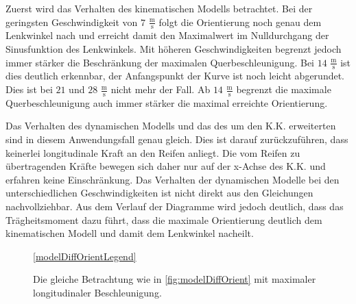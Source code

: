 \documentclass{like}
\begin{document}
Zuerst wird das Verhalten des kinematischen Modells betrachtet. Bei der geringsten Geschwindigkeit von $7$ $\frac{\text{m}}{\text{s}}$ folgt die Orientierung noch genau dem Lenkwinkel nach und erreicht damit den Maximalwert im Nulldurchgang der Sinusfunktion des Lenkwinkels. Mit höheren Geschwindigkeiten begrenzt jedoch immer stärker die Beschränkung der maximalen Querbeschleunigung. Bei $14$ $\frac{\text{m}}{\text{s}}$ ist dies deutlich erkennbar, der Anfangspunkt der Kurve ist noch leicht abgerundet. Dies ist bei $21$ und $28$ $\frac{\text{m}}{\text{s}}$ nicht mehr der Fall. Ab  $14$ $\frac{\text{m}}{\text{s}}$ begrenzt die maximale Querbeschleunigung auch immer stärker die maximal erreichte Orientierung. 

Das Verhalten des dynamischen Modells und das des um den \ac{K.K.} erweiterten sind in diesem Anwendungsfall genau gleich. Dies ist darauf zurückzuführen, dass keinerlei longitudinale Kraft an den Reifen anliegt. Die vom Reifen zu übertragenden Kräfte bewegen sich daher nur auf der x-Achse des \ac{K.K.} und erfahren keine Einschränkung. 
Das Verhalten der dynamischen Modelle bei den unterschiedlichen Geschwindigkeiten ist nicht direkt aus den Gleichungen nachvollziehbar. Aus dem Verlauf der Diagramme wird jedoch deutlich, dass das Trägheitsmoment dazu führt, dass die maximale Orientierung deutlich dem kinematischen Modell und damit dem Lenkwinkel nacheilt. 

\begin{figure}
	\centering
	\subfigure{
		 
	}%
	\subfigure{
		 
	}	
	\ref{modelDiffOrientLegend}
	\caption{Die gleiche Betrachtung wie in \ref{fig:modelDiffOrient} mit maximaler longitudinaler Beschleunigung.}\label{fig:modelDiffOrientMaxAcc}
\end{figure}
\end{document}
